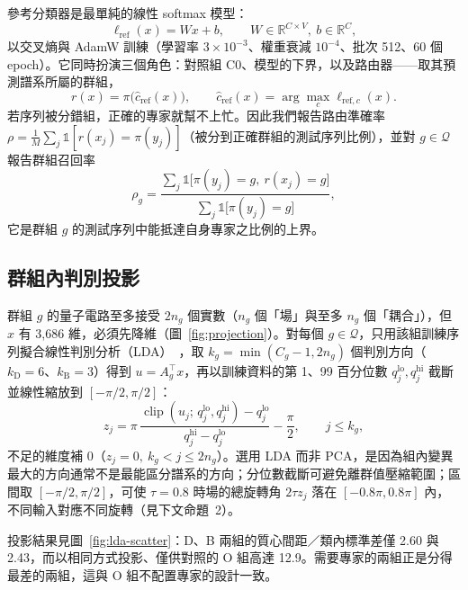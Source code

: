 \documentclass[10pt,a4paper]{article}
\begin{document}
參考分類器是最單純的線性 softmax 模型：
\begin{equation}
    \ell_{\mathrm{ref}}(x)=Wx+b,\qquad W\in\mathbb{R}^{C\times V},\ b\in\mathbb{R}^{C},
    \label{eq:reference}
\end{equation}
以交叉熵與 AdamW 訓練（學習率 $3\times10^{-3}$、權重衰減 $10^{-4}$、批次 512、60 個 epoch）。它同時扮演三個角色：對照組 C0、模型的下界，以及路由器——取其預測譜系所屬的群組，
\begin{equation}
    r(x)=\pi\big(\hat{c}_{\mathrm{ref}}(x)\big),\qquad \hat{c}_{\mathrm{ref}}(x)=\arg\max_{c}\ell_{\mathrm{ref},c}(x).
    \label{eq:router}
\end{equation}
若序列被分錯組，正確的專家就幫不上忙。因此我們報告路由準確率 $\rho=\frac1M\sum_j\mathbb{1}[r(x_j)=\pi(y_j)]$（被分到正確群組的測試序列比例），並對 $g\in\mathcal{Q}$ 報告群組召回率
\begin{equation}
    \rho_g=\frac{\sum_{j}\mathbb{1}\big[\pi(y_j)=g,\ r(x_j)=g\big]}{\sum_{j}\mathbb{1}\big[\pi(y_j)=g\big]},
    \label{eq:routing-recall}
\end{equation}
它是群組 $g$ 的測試序列中能抵達自身專家之比例的上界。

\subsection{群組內判別投影}
\label{sec:projection}

群組 $g$ 的量子電路至多接受 $2n_g$ 個實數（$n_g$ 個「場」與至多 $n_g$ 個「耦合」），但 $x$ 有 3,686 維，必須先降維（圖~\ref{fig:projection}）。對每個 $g\in\mathcal{Q}$，只用該組訓練序列擬合線性判別分析（LDA）~\cite{fisher1936}，取 $k_g=\min(C_g-1,2n_g)$ 個判別方向（$k_{\mathrm{D}}=6$、$k_{\mathrm{B}}=3$）得到 $u=A_g^{\top}x$，再以訓練資料的第 1、99 百分位數 $q^{\mathrm{lo}}_j,q^{\mathrm{hi}}_j$ 截斷並線性縮放到 $[-\pi/2,\pi/2]$：
\begin{equation}
    z_j=\pi\,\frac{\operatorname{clip}(u_j;\,q^{\mathrm{lo}}_j,q^{\mathrm{hi}}_j)-q^{\mathrm{lo}}_j}{q^{\mathrm{hi}}_j-q^{\mathrm{lo}}_j}-\frac{\pi}{2},\qquad j\le k_g,
    \label{eq:scaling}
\end{equation}
不足的維度補 0（$z_j=0,\ k_g<j\le2n_g$）。選用 LDA 而非 PCA，是因為組內變異最大的方向通常不是最能區分譜系的方向；分位數截斷可避免離群值壓縮範圍；區間取 $[-\pi/2,\pi/2]$，可使 $\tau=0.8$ 時場的總旋轉角 $2\tau z_j$ 落在 $[-0.8\pi,0.8\pi]$ 內，不同輸入對應不同旋轉（見下文命題~2）。

投影結果見圖~\ref{fig:lda-scatter}：D、B 兩組的質心間距／類內標準差僅 2.60 與 2.43，而以相同方式投影、僅供對照的 O 組高達 12.9。需要專家的兩組正是分得最差的兩組，這與 O 組不配置專家的設計一致。
\end{document}

